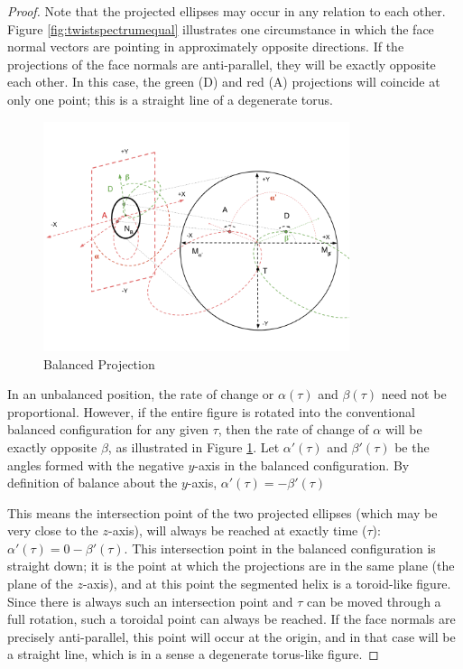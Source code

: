 \documentclass[11pt]{article}
\begin{document}
{\begin{proof}
    Note that the projected ellipses may occur in any relation to each other.
    Figure \ref{fig:twistspectrumequal} illustrates one circumstance in which the face normal
    vectors are pointing in approximately opposite directions.
    If the
    projections of the
    face normals are anti-parallel, they will be exactly opposite each other. In this
    case, the green (D) and red (A) projections will coincide at only one point; this
    is a straight line of a degenerate torus.
        \begin{figure}
     \centering
     \includegraphics[width=0.80\textwidth]{figures/TwistSpectrumProjection.png}
     \caption{Balanced Projection}
  \label{fig:twistspectrumprojection}
    \end{figure}

    In an unbalanced position, the rate of change or $\alpha(\tau)$ and $\beta(\tau)$
    need not be proportional.
    However, if the entire figure is rotated into
    the conventional balanced configuration for any given $\tau$, then the rate of
    change of $\alpha$ will be exactly opposite $\beta$,
    as illustrated in Figure \ref{fig:twistspectrumprojection}. Let $\alpha'(\tau)$ and $\beta'(\tau)$ be the angles
    formed with the negative $y$-axis in the balanced configuration. By definition of balance about the $y$-axis,
    $\alpha'(\tau) = -\beta'(\tau)$

    This means the
    intersection point of the two projected ellipses (which may be very close to the
    $z$-axis), will always be reached at exactly time ($\tau$): $\alpha'(\tau) = 0 - \beta'(\tau)$.
    This intersection point
    in the balanced configuration is straight down; it is the point at which the projections
    are in the same plane (the plane of the $z$-axis), and at this point the segmented
    helix is a toroid-like figure. Since there is always such an intersection point
    and  $\tau$ can be moved through a full rotation, such a toroidal point can always be reached.
    If the face normals are precisely anti-parallel, this point will occur at the origin,
    and in that case will be a straight line, which is in a sense a degenerate torus-like figure.


\end{proof}}
\end{document}
